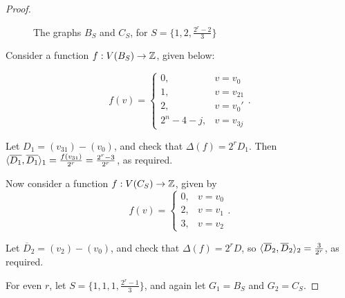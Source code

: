 \documentclass{amsart}
\begin{document}
\begin{proof}
\begin{figure}[H]
\begin{center}
    \end{center}
    \caption{The graphs $B_S$ and $C_S$, for $S = \{1,2,\frac{2^r - 2}{3}\}$}
  \end{figure}

  Consider a function $f:V(B_S) \to \mathbb{Z}$, given below:
  
  \begin{equation*}
    f(v) = 
    \begin{cases}
      0, & v = v_0 \\
      1, & v = v_{21} \\
      2, & v = v_0' \\
      2^n - 4 - j, & v = v_{3j}
    \end{cases}.
  \end{equation*}

  Let $D_1 = (v_{31}) - (v_0)$, and check that $\Delta(f) =
  2^rD_1$. Then $\langle \overline{D_1}, \overline{D_1} \rangle_1 =
  \frac{f(v_{31})}{2^r} = \frac{2^r - 3}{2^r}$, as required.

  Now consider a function $f:V(C_S) \to \mathbb{Z}$, given by
  \begin{equation*}
    f(v) = 
    \begin{cases}
      0, & v = v_0\\
      2, & v = v_1\\
      3, & v = v_2
    \end{cases}.
  \end{equation*}

  Let $\overline{D}_2 = (v_2) - (v_0)$, and check that $\Delta(f) =
  2^rD$, so $\langle \overline{D}_2, \overline{D}_2 \rangle_2 = \frac{3}{2^r}$,
  as required.

  For even $r$, let $S = \{1, 1, 1, \frac{2^r - 1}{3}\}$, and again
  let $G_1 = B_S$ and $G_2 = C_S$. 


\end{proof}
\end{document}
